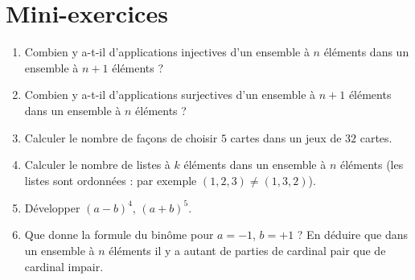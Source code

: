 \section{Mini-exercices}

\begin{frame}
\begin{miniexercice}
\begin{enumerate}
  \item Combien y a-t-il d'applications injectives d'un ensemble à $n$ éléments dans un ensemble à $n+1$ éléments ?
  \item Combien y a-t-il d'applications surjectives d'un ensemble à $n+1$ éléments dans un ensemble à $n$ éléments ?
  \item Calculer le nombre de façons de choisir $5$ cartes dans un jeux de $32$ cartes.
  \item Calculer le nombre de listes à $k$ éléments dans un ensemble à $n$ éléments ({\small les listes sont ordonnées :
par exemple $(1,2,3) \neq (1,3,2)$}).
  \item Développer $(a-b)^4$, $(a+b)^5$.
  \item Que donne la formule du binôme pour $a=-1$, $b=+1$ ? En déduire que dans un ensemble à $n$ éléments il y a
autant de parties de cardinal pair que de cardinal impair.
\end{enumerate}
\end{miniexercice}
\end{frame}

